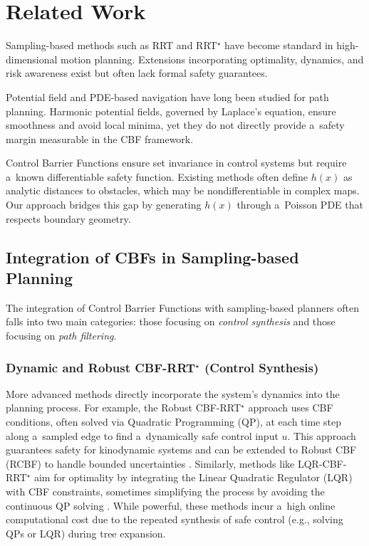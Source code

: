 \documentclass{svproc}
\begin{document}
\section{Related Work}
Sampling-based methods such as RRT and RRT$^\star$ \cite{karaman2011samplingbasedalgorithmsoptimalmotion} have
become standard in high-dimensional motion planning. Extensions incorporating
optimality, dynamics, and risk awareness exist but often lack formal safety guarantees.

Potential field and PDE-based navigation \cite{s22093295} have long
been studied for path planning. Harmonic potential fields, governed by Laplace's
equation, ensure smoothness and avoid local minima, yet they do not directly
provide a~safety margin measurable in the CBF framework.

Control Barrier Functions \cite{8796030,garg2023advancestheorycontrolbarrier} ensure set
invariance in control systems but require a~known differentiable safety
function. Existing methods often define $h(x)$ as analytic distances to
obstacles, which may be nondifferentiable in complex maps. Our approach
bridges this gap by generating $h(x)$ through a~Poisson PDE that respects
boundary geometry.

\subsection{Integration of CBFs in Sampling-based Planning}
The integration of Control Barrier Functions with sampling-based planners often
falls into two main categories: those focusing on \textit{control synthesis} and those
focusing on \textit{path filtering}.

\subsubsection{Dynamic and Robust CBF-RRT$^\star$ (Control Synthesis)}
    More advanced methods
    directly incorporate the system's dynamics into the planning process. For example,
    the Robust CBF-RRT$^\star$ approach \cite{Yang_2019} uses CBF conditions, often solved
    via Quadratic Programming (QP), at each time step along a~sampled edge to
    find a~dynamically safe control input $u$. This approach guarantees safety
    for kinodynamic systems and can be extended to Robust CBF (RCBF) to
    handle bounded uncertainties \cite{Yang_2019}. Similarly, methods like
    LQR-CBF-RRT$^\star$ aim for optimality by integrating the Linear Quadratic
    Regulator (LQR) with CBF constraints, sometimes simplifying the process by
    avoiding the continuous QP solving \cite{yang2023lqrcbfrrtsafeoptimalmotion}. While powerful,
    these methods incur a~high online computational cost due to the repeated
    synthesis of safe control (e.g., solving QPs or LQR) during tree expansion.
\end{document}
